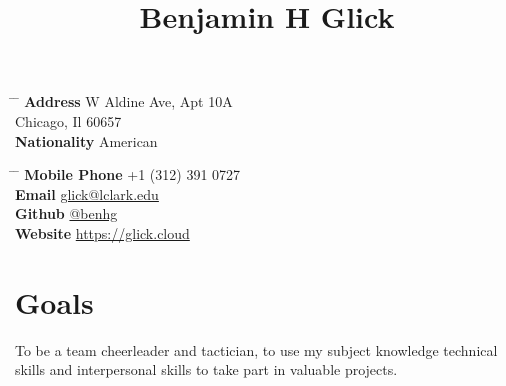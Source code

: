 \documentclass[10pt]{article} %
\begin{document}

\title{Benjamin H Glick} %


\parbox{0.5\textwidth}{ %
\begin{tabbing} %
\hspace{3cm} \= \hspace{4cm} \= \kill %
{\bf Address}  W Aldine Ave, Apt 10A\\ %
\>Chicago, Il 60657  \\ %
{\bf Nationality} \> American %
\end{tabbing}}
\hfill %
\parbox{0.5\textwidth}{ %
\begin{tabbing} %
\hspace{3cm} \= \hspace{4cm} \= \kill %
{\bf Mobile Phone} \> +1 (312) 391 0727 \\ %
{\bf Email} \> \href{mailto:glick@lclark.edu}{glick@lclark.edu} \\ %
{\bf Github} \> \href{https://github.com/benhg}{@benhg} \\ %
{\bf Website} \> \href{https://glick.cloud}{https://glick.cloud} \\ %
\end{tabbing}}


\section{Goals}

{To be a team cheerleader and tactician, to use my subject knowledge technical skills and interpersonal skills to take part in valuable projects.}
\end{document}
